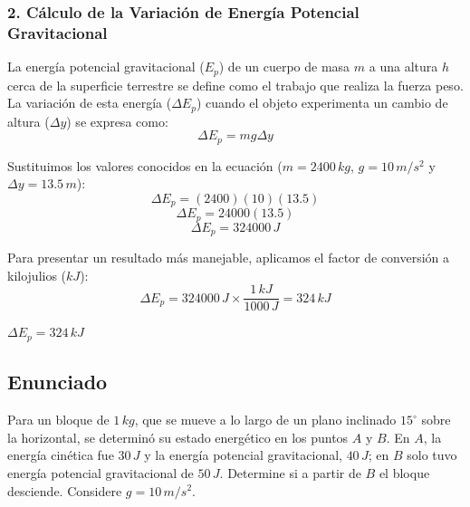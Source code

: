 \documentclass[12pt, a4paper]{article}
\begin{document}
\subsubsection*{2. Cálculo de la Variación de Energía Potencial Gravitacional}
La energía potencial gravitacional ($E_p$) de un cuerpo de masa $m$ a una altura $h$ cerca de la superficie terrestre se define como el trabajo que realiza la fuerza peso. La variación de esta energía ($\Delta E_p$) cuando el objeto experimenta un cambio de altura ($\Delta y$) se expresa como:
$$ \Delta E_p = m g \Delta y $$

Sustituimos los valores conocidos en la ecuación ($m = 2400 \, \si{kg}$, $g = 10 \, \si{m/s^2}$ y $\Delta y = 13.5 \, \si{m}$):
$$ \Delta E_p = (2400) (10) (13.5) $$
$$ \Delta E_p = 24000 (13.5) $$
$$ \Delta E_p = 324000 \, \si{J} $$

Para presentar un resultado más manejable, aplicamos el factor de conversión a kilojulios ($\si{kJ}$):
$$ \Delta E_p = 324000 \, \si{J} \times \frac{1 \, \si{kJ}}{1000 \, \si{J}} = 324 \, \si{kJ} $$

\begin{tcolorbox}[colback=green!5!white, colframe=green!50!black, title=Respuesta Final]
\centering \Large $\Delta E_p = 324 \, \si{kJ}$
\end{tcolorbox}

\newpage

\subsection*{Enunciado}
Para un bloque de $1 \, \si{kg}$, que se mueve a lo largo de un plano inclinado $15^\circ$ sobre la horizontal, se determinó su estado energético en los puntos $A$ y $B$. En $A$, la energía cinética fue $30 \, \si{J}$ y la energía potencial gravitacional, $40 \, \si{J}$; en $B$ solo tuvo energía potencial gravitacional de $50 \, \si{J}$. Determine si a partir de $B$ el bloque desciende. Considere $g = 10 \, \si{m/s^2}$.

\begin{center}
\end{center}
\end{document}

